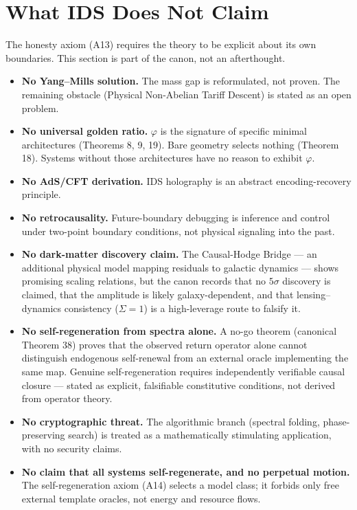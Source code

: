 \documentclass[11pt,a4paper]{article}
\theoremstyle{plain}
\begin{document}
\section{What IDS Does Not Claim}\label{sec:notclaim}

The honesty axiom (A13) requires the theory to be explicit about its own boundaries. This section is part of the canon, not an afterthought.

\begin{itemize}[itemsep=2pt,topsep=3pt]
\item \textbf{No Yang--Mills solution.} The mass gap is reformulated, not proven. The remaining obstacle (Physical Non-Abelian Tariff Descent) is stated as an open problem.
\item \textbf{No universal golden ratio.} $\varphi$ is the signature of specific minimal architectures (Theorems 8, 9, 19). Bare geometry selects nothing (Theorem 18). Systems without those architectures have no reason to exhibit $\varphi$.
\item \textbf{No AdS/CFT derivation.} IDS holography is an abstract encoding-recovery principle.
\item \textbf{No retrocausality.} Future-boundary debugging is inference and control under two-point boundary conditions, not physical signaling into the past.
\item \textbf{No dark-matter discovery claim.} The Causal-Hodge Bridge --- an additional physical model mapping residuals to galactic dynamics --- shows promising scaling relations, but the canon records that no $5\sigma$ discovery is claimed, that the amplitude is likely galaxy-dependent, and that lensing--dynamics consistency ($\Sigma=1$) is a high-leverage route to falsify it.
\item \textbf{No self-regeneration from spectra alone.} A no-go theorem (canonical Theorem 38) proves that the observed return operator alone cannot distinguish endogenous self-renewal from an external oracle implementing the same map. Genuine self-regeneration requires independently verifiable causal closure --- stated as explicit, falsifiable constitutive conditions, not derived from operator theory.
\item \textbf{No cryptographic threat.} The algorithmic branch (spectral folding, phase-preserving search) is treated as a mathematically stimulating application, with no security claims.
\item \textbf{No claim that all systems self-regenerate, and no perpetual motion.} The self-regeneration axiom (A14) selects a model class; it forbids only free external template oracles, not energy and resource flows.
\end{itemize}
\end{document}
